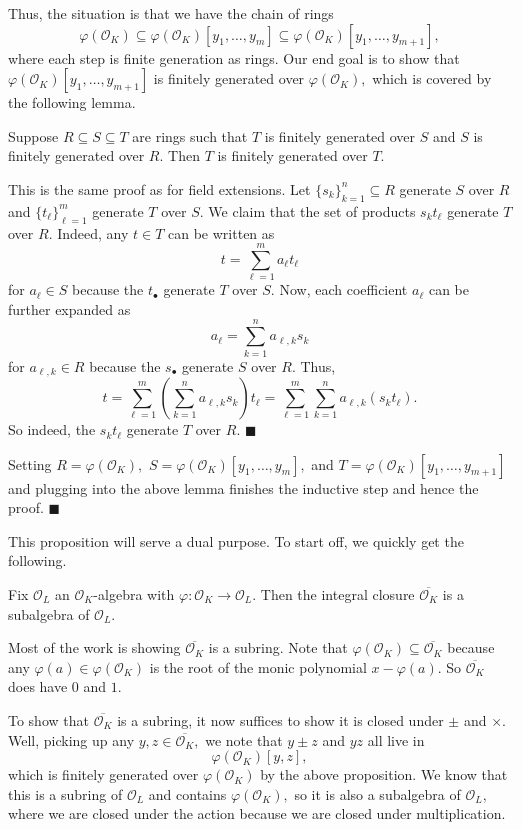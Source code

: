 Thus, the situation is that we have the chain of rings
\[\varphi(\mathcal O_K)\subseteq\varphi(\mathcal O_K)[y_1,\ldots,y_m]\subseteq\varphi(\mathcal O_K)[y_1,\ldots,y_{m+1}],\]
where each step is finite generation as rings. Our end goal is to show that $\varphi(\mathcal O_K)[y_1,\ldots,y_{m+1}]$ is finitely generated over $\varphi(\mathcal O_K),$ which is covered by the following lemma.
\begin{lemma}
    Suppose $R\subseteq S\subseteq T$ are rings such that $T$ is finitely generated over $S$ and $S$ is finitely generated over $R.$ Then $T$ is finitely generated over $T.$
\end{lemma}
This is the same proof as for field extensions. Let $\{s_k\}_{k=1}^n\subseteq R$ generate $S$ over $R$ and $\{t_\ell\}_{\ell=1}^m$ generate $T$ over $S.$ We claim that the set of products $s_kt_\ell$ generate $T$ over $R.$ Indeed, any $t\in T$ can be written as
\[t=\sum_{\ell=1}^ma_\ell t_\ell\]
for $a_\ell\in S$ because the $t_\bullet$ generate $T$ over $S.$ Now, each coefficient $a_\ell$ can be further expanded as
\[a_\ell=\sum_{k=1}^na_{\ell,k}s_k\]
for $a_{\ell,k}\in R$ because the $s_\bullet$ generate $S$ over $R.$ Thus,
\[t=\sum_{\ell=1}^m\left(\sum_{k=1}^na_{\ell,k}s_k\right)t_{\ell}=\sum_{\ell=1}^m\sum_{k=1}^na_{\ell,k}(s_kt_\ell).\]
So indeed, the $s_kt_\ell$ generate $T$ over $R.$ $\blacksquare$

Setting $R=\varphi(\mathcal O_K),$ $S=\varphi(\mathcal O_K)[y_1,\ldots,y_m],$ and $T=\varphi(\mathcal O_K)[y_1,\ldots,y_{m+1}]$ and plugging into the above lemma finishes the inductive step and hence the proof. $\blacksquare$

This proposition will serve a dual purpose. To start off, we quickly get the following.
\begin{lemma}
    Fix $\mathcal O_L$ an $\mathcal O_K$-algebra with $\varphi:\mathcal O_K\to\mathcal O_L.$ Then the integral closure $\overline{\mathcal O_K}$ is a subalgebra of $\mathcal O_L.$
\end{lemma}
Most of the work is showing $\overline{\mathcal O_K}$ is a subring. Note that $\varphi(\mathcal O_K)\subseteq\overline{\mathcal O_K}$ because any $\varphi(a)\in\varphi(\mathcal O_K)$ is the root of the monic polynomial $x-\varphi(a).$ So $\overline{\mathcal O_K}$ does have $0$ and $1.$

To show that $\overline{\mathcal O_K}$ is a subring, it now suffices to show it is closed under $\pm$ and $\times.$ Well, picking up any $y,z\in\overline{\mathcal O_K},$ we note that $y\pm z$ and $yz$ all live in
\[\varphi(\mathcal O_K)[y,z],\]
which is finitely generated over $\varphi(\mathcal O_K)$ by the above proposition. We know that this is a subring of $\mathcal O_L$ and contains $\varphi(\mathcal O_K),$ so it is also a subalgebra of $\mathcal O_L,$ where we are closed under the action because we are closed under multiplication.

